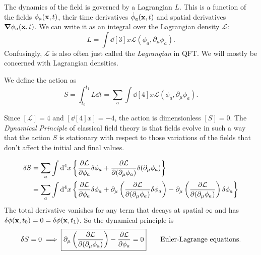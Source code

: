 The dynamics of the field is governed by a Lagrangian $L$. This is a function of the fields $\phi_a(\vb x, t)$, their time derivatives $\dot \phi_a(\vb x, t)$ and spatial derivatives $\grad \phi_a(\vb x, t)$.
We can write it as an integral over the Lagrangian density $\mathcal{L}$:
\begin{equation}
  L = \int \dd[3]{x} \mathcal{L}(\phi_a, \partial_\mu \phi_a).
\end{equation}
Confusingly, $\mathcal{L}$ is also often just called the \emph{Lagrangian} in QFT. We will mostly be concerned with Lagrangian densities.

We define the action as 
\begin{equation}
  S = \int_{t_0}^{t_1} L \dd{t} = \sum_{a} \int \dd[4]{x} \mathcal{L}(\phi_a, \partial_\mu \phi_a).
\end{equation}

Since $[\mathcal{L}] = 4$ and $[\dd[4]{x}] = -4$, the action is dimensionless $[S] = 0$.
The \emph{Dynamical Principle} of classical field theory is that fields evolve in such a way that the action $S$ is stationary with respect to those variations of the fields that don't affect the initial and final values.

\begin{align}
  \label{eq:variation in S}
  \delta S &= \sum_a \int \dd[4]{x} \left\{ \pdv{\mathcal{L}}{\phi_a} \delta \phi_a + \pdv{\mathcal{L}}{(\partial_\mu \phi_a)} \delta(\partial_\mu \phi_a) \right\} \\
	   &= \sum_a \int \dd[4]{x} \left\{ \pdv{\mathcal{L}}{\phi_a} \delta \phi_a + \partial_\mu \left( \pdv{\mathcal{L}}{(\partial_\mu \phi_a)} \delta \phi_a \right) - \partial_\mu \left( \pdv{\mathcal{L}}{(\partial_\mu \phi_a)} \right) \delta \phi_a \right\}
\end{align}
The total derivative vanishes for any term that decays at spatial $\infty$ and has $\delta \phi(\vb x, t_0) = 0 = \delta \phi(\vb x, t_1)$. So the dynamical principle is
\begin{equation}
  \label{eq:EL}
  \delta S = 0 \implies \boxed{\partial_\mu \left( \pdv{\mathcal{L}}{(\partial_\mu \phi_a)}\right) - \pdv{\mathcal{L}}{\phi_a} = 0 } \qquad \text{Euler-Lagrange equations}.
\end{equation}

